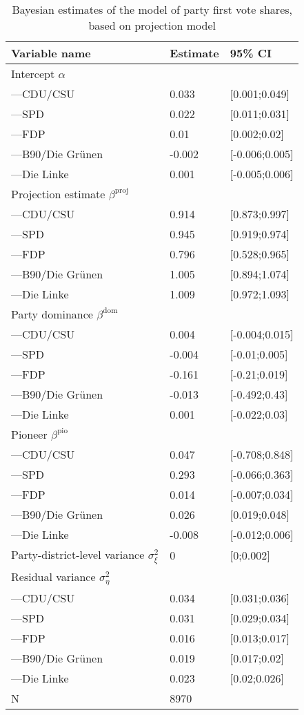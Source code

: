 \begin{table}[t!]
\centering
\caption{Bayesian estimates of the model of party first vote shares, based on projection model} 
\begin{tabular}{lll}
  \hline
Variable name & Estimate & 95\% CI \\ 
  \hline
Intercept $\alpha$ &  &  \\ 
  ---CDU/CSU & 0.033 & [0.001;0.049] \\ 
  ---SPD & 0.022 & [0.011;0.031] \\ 
  ---FDP & 0.01 & [0.002;0.02] \\ 
  ---B90/Die Gr\"unen & -0.002 & [-0.006;0.005] \\ 
  ---Die Linke & 0.001 & [-0.005;0.006] \\ 
  Projection estimate $\beta^\text{proj}$ &  &  \\ 
  ---CDU/CSU & 0.914 & [0.873;0.997] \\ 
  ---SPD & 0.945 & [0.919;0.974] \\ 
  ---FDP & 0.796 & [0.528;0.965] \\ 
  ---B90/Die Gr\"unen & 1.005 & [0.894;1.074] \\ 
  ---Die Linke & 1.009 & [0.972;1.093] \\ 
  Party dominance $\beta^\text{dom}$ &  &  \\ 
  ---CDU/CSU & 0.004 & [-0.004;0.015] \\ 
  ---SPD & -0.004 & [-0.01;0.005] \\ 
  ---FDP & -0.161 & [-0.21;0.019] \\ 
  ---B90/Die Gr\"unen & -0.013 & [-0.492;0.43] \\ 
  ---Die Linke & 0.001 & [-0.022;0.03] \\ 
  Pioneer  $\beta^\text{pio}$ &  &  \\ 
  ---CDU/CSU & 0.047 & [-0.708;0.848] \\ 
  ---SPD & 0.293 & [-0.066;0.363] \\ 
  ---FDP & 0.014 & [-0.007;0.034] \\ 
  ---B90/Die Gr\"unen & 0.026 & [0.019;0.048] \\ 
  ---Die Linke & -0.008 & [-0.012;0.006] \\ 
  Party-district-level variance $\sigma^2_{\xi}$  & 0 & [0;0.002] \\ 
  Residual variance $\sigma^2_{\eta}$ &  &  \\ 
  ---CDU/CSU & 0.034 & [0.031;0.036] \\ 
  ---SPD & 0.031 & [0.029;0.034] \\ 
  ---FDP & 0.016 & [0.013;0.017] \\ 
  ---B90/Die Gr\"unen & 0.019 & [0.017;0.02] \\ 
  ---Die Linke & 0.023 & [0.02;0.026] \\ 
  N & 8970 &  \\ 
   \hline
\end{tabular}
\end{table}
